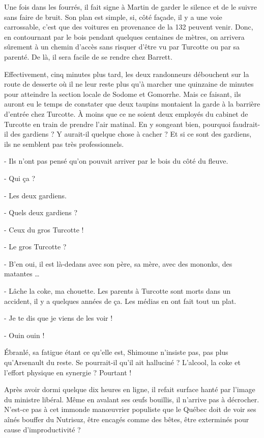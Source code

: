 Une fois dans les fourrés, il fait signe à Martin de garder le silence et de le suivre sans faire de bruit. Son plan est simple, si, côté façade, il y a une voie carrossable, c’est que des voitures en provenance de la 132 peuvent venir. Donc, en contournant par le bois pendant quelques centaines de mètres, on arrivera sûrement à un chemin d’accès sans risquer d’être vu par Turcotte ou par sa parenté. De là, il sera facile de se rendre chez Barrett.

Effectivement, cinq minutes plus tard, les deux randonneurs débouchent sur la route de desserte où il ne leur reste plus qu’à marcher une quinzaine de minutes pour atteindre la section locale de Sodome et Gomorrhe. Mais ce faisant, ils auront eu le temps de constater que deux taupins montaient la garde à la barrière d’entrée chez Turcotte. À moins que ce ne soient deux employés du cabinet de Turcotte en train de prendre l’air matinal. En y songeant bien, pourquoi faudrait-il des gardiens ? Y aurait-il quelque chose à cacher ? Et si ce sont des gardiens, ils ne semblent pas très professionnels.

- Ils n’ont pas pensé qu’on pouvait arriver par le bois du côté du fleuve.

- Qui ça ?

- Les deux gardiens.

- Quels deux gardiens ?

- Ceux du gros Turcotte !

- Le gros Turcotte ?

- B’en oui, il est là-dedans avec son père, sa mère, avec des mononks, des matantes …

- Lâche la coke, ma chouette. Les parents à Turcotte sont morts dans un accident, il y a quelques années de ça. Les médias en ont fait tout un plat.

- Je te dis que je viens de les voir !

- Ouin ouin !

Ébranlé, sa fatigue étant ce qu’elle est, Shimoune n’insiste pas, pas plus qu’Arsenault du reste. Se pourrait-il qu’il ait halluciné ? L’alcool, la coke et l’effort physique en synergie ? Pourtant !

Après avoir dormi quelque dix heures en ligne, il refait surface hanté par l’image du ministre libéral. Même en avalant ses œufs bouillis, il n’arrive pas à décrocher. N’est-ce pas à cet immonde manœuvrier populiste que le Québec doit de voir ses aînés bouffer du Nutrisuz, être encagés comme des bêtes, être exterminés pour cause d’improductivité ?

